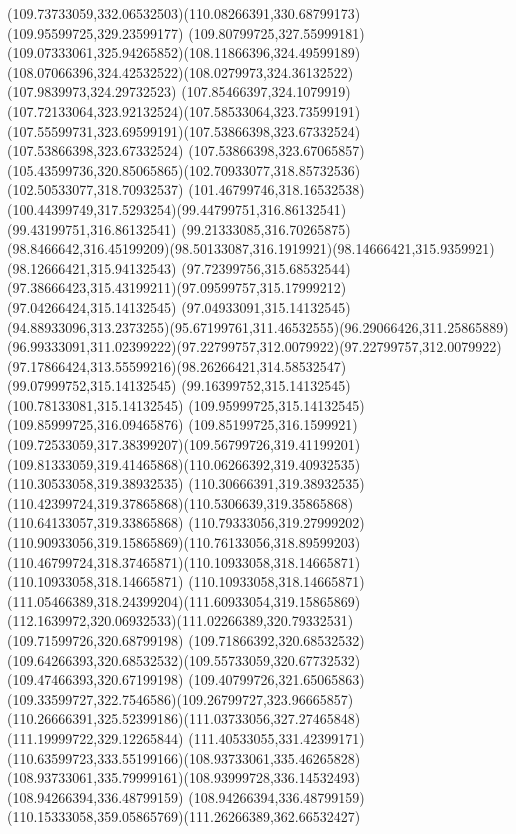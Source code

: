 {{\curveto(109.73733059,332.06532503)(110.08266391,330.68799173)(109.95599725,329.23599177)
\curveto(109.80799725,327.55999181)(109.07333061,325.94265852)(108.11866396,324.49599189)
\curveto(108.07066396,324.42532522)(108.0279973,324.36132522)(107.9839973,324.29732523)
\curveto(107.85466397,324.1079919)(107.72133064,323.92132524)(107.58533064,323.73599191)
\curveto(107.55599731,323.69599191)(107.53866398,323.67332524)(107.53866398,323.67332524)
\lineto(107.53866398,323.67065857)
\curveto(105.43599736,320.85065865)(102.70933077,318.85732536)(102.50533077,318.70932537)
\curveto(101.46799746,318.16532538)(100.44399749,317.5293254)(99.44799751,316.86132541)
\lineto(99.43199751,316.86132541)
\lineto(99.21333085,316.70265875)
\curveto(98.8466642,316.45199209)(98.50133087,316.1919921)(98.14666421,315.9359921)
\lineto(98.12666421,315.94132543)
\curveto(97.72399756,315.68532544)(97.38666423,315.43199211)(97.09599757,315.17999212)
\lineto(97.04266424,315.14132545)
\lineto(97.04933091,315.14132545)
\curveto(94.88933096,313.2373255)(95.67199761,311.46532555)(96.29066426,311.25865889)
\curveto(96.99333091,311.02399222)(97.22799757,312.0079922)(97.22799757,312.0079922)
\curveto(97.17866424,313.55599216)(98.26266421,314.58532547)(99.07999752,315.14132545)
\lineto(99.16399752,315.14132545)
\lineto(100.78133081,315.14132545)
\lineto(109.95999725,315.14132545)
\lineto(109.85999725,316.09465876)
\curveto(109.85199725,316.1599921)(109.72533059,317.38399207)(109.56799726,319.41199201)
\curveto(109.81333059,319.41465868)(110.06266392,319.40932535)(110.30533058,319.38932535)
\lineto(110.30666391,319.38932535)
\curveto(110.42399724,319.37865868)(110.5306639,319.35865868)(110.64133057,319.33865868)
\curveto(110.79333056,319.27999202)(110.90933056,319.15865869)(110.76133056,318.89599203)
\curveto(110.46799724,318.37465871)(110.10933058,318.14665871)(110.10933058,318.14665871)
\curveto(110.10933058,318.14665871)(111.05466389,318.24399204)(111.60933054,319.15865869)
\curveto(112.1639972,320.06932533)(111.02266389,320.79332531)(109.71599726,320.68799198)
\lineto(109.71866392,320.68532532)
\curveto(109.64266393,320.68532532)(109.55733059,320.67732532)(109.47466393,320.67199198)
\curveto(109.40799726,321.65065863)(109.33599727,322.7546586)(109.26799727,323.96665857)
\curveto(110.26666391,325.52399186)(111.03733056,327.27465848)(111.19999722,329.12265844)
\curveto(111.40533055,331.42399171)(110.63599723,333.55199166)(108.93733061,335.46265828)
\curveto(108.93733061,335.79999161)(108.93999728,336.14532493)(108.94266394,336.48799159)
\curveto(108.94266394,336.48799159)(110.15333058,359.05865769)(111.26266389,362.66532427)
}}
